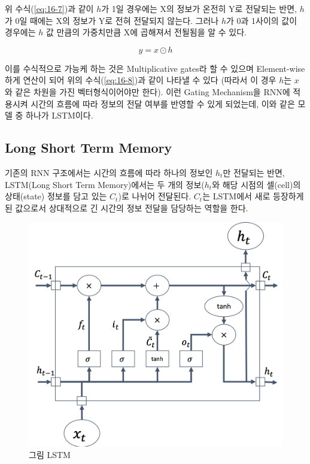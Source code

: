 \documentclass[draft=false]{oblivoir}
\begin{document}
위 수식(\ref{eq:16-7})과 같이 $h$가 1일 경우에는 X의 정보가 온전히 Y로 전달되는 반면, $h$가 0일 때에는 X의 정보가 Y로 전혀 전달되지 않는다. 그러나 $h$가 0과  1사이의 값이 경우에는 $h$ 값 만큼의 가중치만큼 X에 곱해져서 전될됨을 알 수 있다. 

\begin{equation}
	y = x \odot h
	\label{eq:16-8}
\end{equation}

이를 수식적으로 가능케 하는 것은 Multiplicative gates라 할 수 있으며 Element-wise하게 연산이 되어 위의 수식(\ref{eq:16-8})과 같이 나타낼 수 있다 (따라서 이 경우 $h$는 $x$와 같은 차원을 가진 벡터형식이어야만 한다). 이런 Gating Mechanism을 RNN에 적용시켜 시간의 흐름에 따라 정보의 전달 여부를 반영할 수 있게 되었는데, 이와 같은 모델 중 하나가 LSTM이다.\par

\subsection{Long Short Term Memory}
기존의 RNN 구조에서는 시간의 흐름에 따라 하나의 정보인 $h_t$만 전달되는 반면, LSTM(Long Short Term Memory)에서는 두 개의 정보($h_t$와 해당 시점의 셀(cell)의 상태(state) 정보를 담고 있는 $C_t$)로 나뉘어 전달된다.  $C_t$는 LSTM에서 새로 등장하게 된 값으로서 상대적으로 긴 시간의 정보 전달을 담당하는 역할을 한다. 

\begin{figure}[ht] \centering 
  \includegraphics[scale=0.5]{fig12.png}
  \caption{그림 LSTM}
  \label{fig:16-12}
\end{figure}
\end{document}
